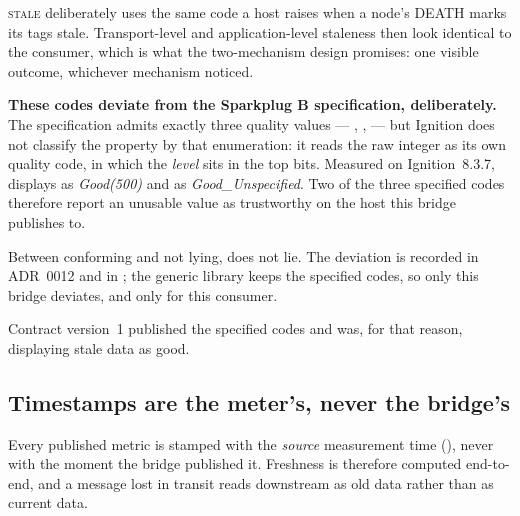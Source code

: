 \textsc{stale} deliberately uses the same code a host raises when a node's DEATH marks its
tags stale. Transport-level and application-level staleness then look identical to the
consumer, which is what the two-mechanism design promises: one visible outcome, whichever
mechanism noticed.

\begin{warning}
\textbf{These codes deviate from the Sparkplug B specification, deliberately.} The
specification admits exactly three quality values —
, ,  — but Ignition does not classify the property by that
enumeration: it reads the raw integer as its own quality code, in which the \emph{level} sits
in the top bits. Measured on Ignition~8.3.7,  displays as \emph{Good(500)} and
 as \emph{Good\_Unspecified}. Two of the three specified codes therefore report an
unusable value as trustworthy on the host this bridge publishes to.

Between conforming and not lying, \prog does not lie. The deviation is recorded in ADR~0012
and in ; the generic  library keeps the
specified codes, so only this bridge deviates, and only for this consumer.

Contract version~1 published the specified codes and was, for that reason, displaying stale
data as good.
\end{warning}

\subsection{Timestamps are the meter's, never the bridge's}

Every published metric is stamped with the \emph{source} measurement time
(), never with the moment the bridge published it. Freshness is therefore
computed end-to-end, and a message lost in transit reads downstream as old data rather
than as current data.

